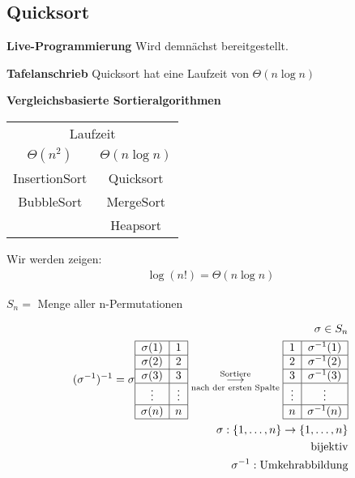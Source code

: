 \subsection{Quicksort}
\textbf{Live-Programmierung}
Wird demnächst bereitgestellt.

\textbf{Tafelanschrieb}
Quicksort hat eine Laufzeit von $\Theta(n \log n)$
\begin{center}
\textbf{Vergleichsbasierte Sortieralgorithmen}\\
\begin{tabular}{c|c}
    \multicolumn{2}{c}{Laufzeit}\\
    $\Theta(n^2)$ & $\Theta(n \log n)$\\
    InsertionSort & Quicksort\\\hline
    BubbleSort & MergeSort\\
     & Heapsort
\end{tabular}
\end{center}
Wir werden zeigen:
\begin{align*}
    \log(n!) = \Theta(n \log n)
\end{align*}


$S_n = $ Menge aller n-Permutationen

\begin{align*}
\sigma \in S_n\\
(\sigma^{-1})^{-1} = \sigma
\begin{array}{|c|c|}\hline
    \sigma(1) & 1\\\hline
    \sigma(2) & 2\\\hline
    \sigma(3) & 3\\\hline
    \vdots & \vdots\\\hline
    \sigma(n) & n\\\hline
\end{array}
\overset{\text{Sortiere}}{\underset{\text{nach der ersten Spalte}}{\longrightarrow}}
\begin{array}{|c|c|}\hline
    1 & \sigma^{-1}(1)\\\hline
    2 & \sigma^{-1}(2)\\\hline
    3 & \sigma^{-1}(3)\\\hline
    \vdots & \vdots\\\hline
    n & \sigma^{-1}(n)\\\hline
\end{array}\\

\sigma: \{1, \dots, n\} \rightarrow \{1, \dots, n\}\\
\text{bijektiv}\\
\sigma^{-1}: \text{Umkehrabbildung}
\end{align*}

